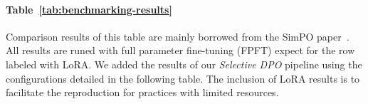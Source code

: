 \vspace{-0.2cm}
\begin{table}[h]
\centering
\caption{Key hyper-parameters used for aligning models on the \textbf{ultrafeedback-bianrized} dataset: Figure~\ref{fig:base-model-struggles}, bottom.}
\renewcommand{\arraystretch}{1.2} 
\label{tab:alignment-recipes-struggles-uf}
\end{table}

\clearpage
\paragraph{Table~\ref{tab:benchmarking-results}} Comparison results of this table are mainly borrowed from the SimPO paper~\cite{meng2024simpo}. All results are runed with full parameter fine-tuning (FPFT) expect for the row labeled with LoRA. We added the results of our \textit{Selective DPO} pipeline using the configurations detailed in the following table. The inclusion of LoRA results is to facilitate the reproduction for practices with limited resources. 

